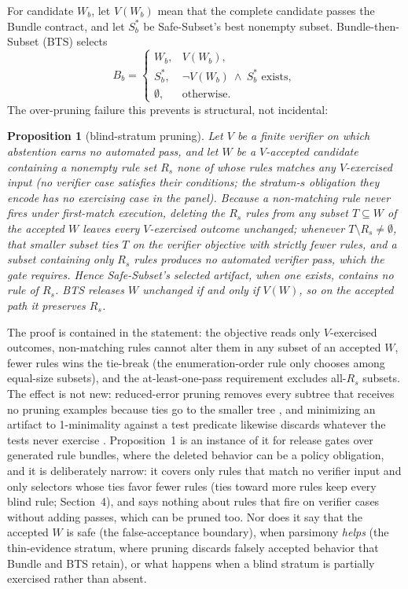 \documentclass{article}
\newtheorem{proposition}{Proposition}
\begin{document}
For candidate $W_b$, let $V(W_b)$ mean that the complete candidate passes the Bundle contract, and let $S_b^*$ be Safe-Subset's best nonempty subset. Bundle-then-Subset (BTS) selects
\begin{equation}
B_b=\begin{cases}
W_b,&V(W_b),\\
S_b^*,&\neg V(W_b)\ \wedge\ S_b^*\text{ exists},\\
\emptyset,&\text{otherwise}.
\end{cases}
\end{equation}
The over-pruning failure this prevents is structural, not incidental:
\begin{proposition}[blind-stratum pruning]
Let $V$ be a finite verifier on which abstention earns no automated pass, and let $W$ be a $V$-accepted candidate containing a nonempty rule set $R_s$ none of whose rules matches any $V$-exercised input (no verifier case satisfies their conditions; the stratum-$s$ obligation they encode has no exercising case in the panel). Because a non-matching rule never fires under first-match execution, deleting the $R_s$ rules from any subset $T \subseteq W$ of the accepted $W$ leaves every $V$-exercised outcome unchanged; whenever $T \setminus R_s \neq \emptyset$, that smaller subset ties $T$ on the verifier objective with strictly fewer rules, and a subset containing only $R_s$ rules produces no automated verifier pass, which the gate requires. Hence Safe-Subset's selected artifact, when one exists, contains no rule of $R_s$. BTS releases $W$ unchanged if and only if $V(W)$, so on the accepted path it preserves $R_s$.
\end{proposition}
The proof is contained in the statement: the objective reads only $V$-exercised outcomes, non-matching rules cannot alter them in any subset of an accepted $W$, fewer rules wins the tie-break (the enumeration-order rule only chooses among equal-size subsets), and the at-least-one-pass requirement excludes all-$R_s$ subsets. The effect is not new: reduced-error pruning removes every subtree that receives no pruning examples because ties go to the smaller tree \citep{elomaa2001rep}, and minimizing an artifact to 1-minimality against a test predicate likewise discards whatever the tests never exercise \citep{zeller2002ddmin,legoues2012genprog,heo2018chisel}. Proposition~1 is an instance of it for release gates over generated rule bundles, where the deleted behavior can be a policy obligation, and it is deliberately narrow: it covers only rules that match no verifier input and only selectors whose ties favor fewer rules (ties toward more rules keep every blind rule; Section~4), and says nothing about rules that fire on verifier cases without adding passes, which can be pruned too. Nor does it say that the accepted $W$ is safe (the false-acceptance boundary), when parsimony \emph{helps} (the thin-evidence stratum, where pruning discards falsely accepted behavior that Bundle and BTS retain), or what happens when a blind stratum is partially exercised rather than absent.
\end{document}

